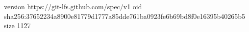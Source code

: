 version https://git-lfs.github.com/spec/v1
oid sha256:37652234a8900e81779d1777a85dde761ba0923fe6b69bd8f0e16395b40265b5
size 1127
